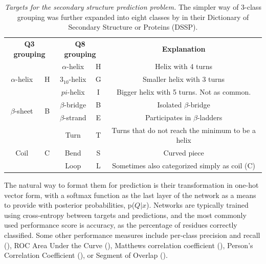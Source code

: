 \begin{table}[h]
	\begin{tabular}{cc|cc|c}
		\multicolumn{2}{c}{\textbf{Q3 grouping}} & \multicolumn{2}{c}{\textbf{Q8 grouping}} &  \textbf{Explanation} \\ 
		&   & $\alpha$-helix & H & Helix with 4 turns \\ 
		$\alpha$-helix    & H & $3_{10}$-helix & G & Smaller helix with 3 turns \\ 
		&   & $pi$-helix      & I & Bigger helix with 5 turns. Not as common.\\ \hline
		\multirow{2}{*}{$\beta$-sheet}    & \multirow{2}{*}{B} & $\beta$-bridge & B & Isolated $\beta$-bridge \\ 
		&                       & $\beta$-strand & E & Participates in $\beta$-ladders \\ \hline
		&   & Turn & T & Turns that do not reach the minimum to be a helix \\ 
		Coil    & C & Bend & S & Curved piece \\ 
		&   & Loop & L & Sometimes also categorized simply as coil (C)
	\end{tabular}
	\label{tab:q8}
	\caption{\textit{Targets for the secondary structure prediction problem.} The simpler way of 3-class grouping was further expanded into eight classes by \cite{Kabsch1983} in their Dictionary of Secondary Structure or Proteins (DSSP).}
\end{table}

The natural way to format them for prediction is their transformation in one-hot vector form, with a softmax function as the last layer of the network as a means to provide with posterior probabilities, p($Q|x$). Networks are typically trained using cross-entropy between targets and predictions, and the most commonly used performance score is accuracy, as the percentage of residues correctly classified. Some other performance measures include per-class precision and recall (\cite{Wang2016}), ROC Area Under the Curve (\cite{Hattori2017}), Matthews correlation coefficient (\cite{Fang2017}), Person's Correlation Coefficient (\cite{Jurtz2017}), or Segment of Overlap (\cite{Wang2016}).

